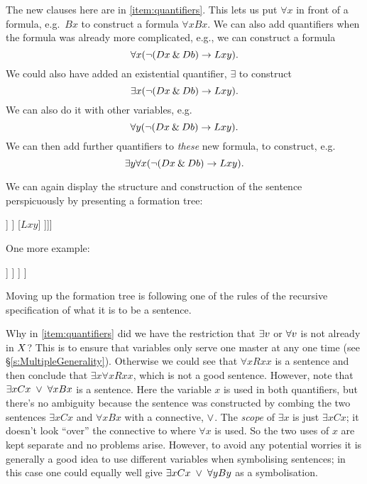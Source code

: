		The new clauses here are in \ref{item:quantifiers}. This lets us put $\forall x$ in front of a formula, e.g.~$Bx$ to construct a formula $\forall xBx$. We can also add quantifiers when the formula was already more complicated, e.g., we can construct a formula $$\forall x(\neg(Dx\mathbin{\&} Db)\rightarrow Lxy).$$ We could also have added an existential quantifier, $\exists$ to construct $$\exists x(\neg(Dx\mathbin{\&} Db)\rightarrow Lxy).$$ We can also do it with other variables, e.g. $$\forall y(\neg(Dx\mathbin{\&} Db)\rightarrow Lxy).$$ We can then add further quantifiers to \emph{these} new formula, to construct, e.g.~$$\exists y\forall x(\neg(Dx\mathbin{\&} Db)\rightarrow Lxy).$$

	We can again display the structure and construction of the sentence perspicuously by presenting a formation tree:

			\begin{center}
			\begin{forest}
				[$\exists y\forall x(\enot(Dx\eand Db)\eif Lxy)$[$\forall x(\enot(Dx\eand Db)\eif Lxy)$[$(\enot(Dx\eand Db)\eif Lxy)$
					[$\enot (Dx\eand Db)$
						[$(Dx\eand Db)$
							[$Dx$]
							[$Db$]
						]
					]
					[$Lxy$]
				]]]
			\end{forest}
			\end{center}

			One more example:

	\begin{center}
	\begin{forest}
		[$\exists z\forall y (Ryz\eand \exists x Qx)$
			[$\forall y (Ryz\eand\exists x Qx)$
				[$(Ryz\eand \exists x Qx)$
					[$Ryz$]
					[$\exists x Qx$
						[$Qx$]
					]
				]
			]
		]
	\end{forest}
	\end{center}
	Moving up the formation tree is following one of the rules of the recursive specification of what it is to be a sentence.



Why in \ref{item:quantifiers} did we have the restriction that $\exists v$ or $\forall v$ is not already in $X$? This is to ensure that variables only serve one master at any one time (see \S\ref{s:MultipleGenerality}).
Otherwise we could see that $\forall x Rxx$ is a sentence and then conclude that $\exists x\forall x Rxx$, which is not a good sentence.  However, note that $\exists x Cx\;\vee\;\forall x Bx$ is a sentence. Here the variable $x$ is used in both quantifiers, but there's no ambiguity because the sentence was constructed by combing the two sentences $\exists x Cx$ and $\forall xBx$ with a connective, $\vee$. The \emph{scope} of $\exists x$ is just $\exists x Cx$; it doesn't look ``over'' the connective to where $\forall x$ is used. So the two uses of $x$ are kept separate and no problems arise. However, to avoid any potential worries it is generally a good idea to use different variables when symbolising sentences; in this case one could equally well give $\exists x Cx\;\vee\;\forall y By$ as a symbolisation.

